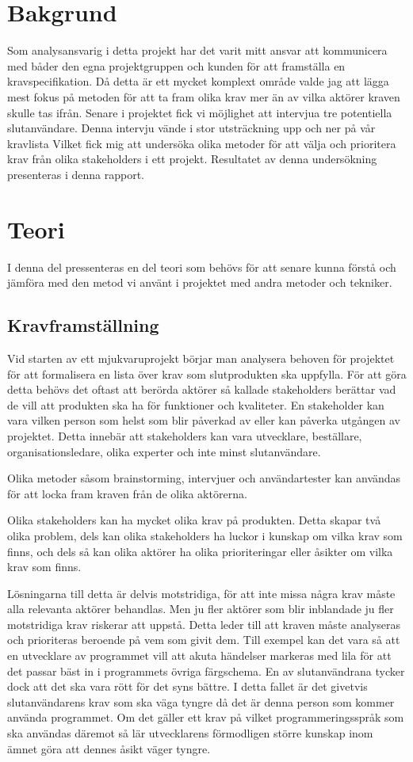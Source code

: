 \section{Bakgrund}
Som analysansvarig i detta projekt har det varit mitt ansvar att kommunicera med båder den egna projektgruppen och kunden för att framställa en kravspecifikation. Då detta är ett mycket komplext område valde jag att lägga mest fokus på metoden för att ta fram olika krav mer än av vilka aktörer kraven skulle tas ifrån. Senare i projektet fick vi möjlighet att intervjua tre potentiella slutanvändare. Denna intervju vände i stor utsträckning upp och ner på vår kravlista Vilket fick mig att undersöka olika metoder för att välja och prioritera krav från olika stakeholders i ett projekt. Resultatet av denna undersökning presenteras i denna rapport.  

\section{Teori}
I denna del pressenteras en del teori som behövs för att senare kunna förstå och jämföra med den metod vi använt i projektet med andra metoder och tekniker.
\subsection{Kravframställning}
Vid starten av ett mjukvaruprojekt börjar man analysera behoven för projektet för att formalisera en lista över krav som slutprodukten ska uppfylla. För att göra detta behövs det oftast att berörda aktörer så kallade stakeholders berättar vad de vill att produkten ska ha för funktioner och kvaliteter. En stakeholder kan vara vilken person som helst som blir påverkad av eller kan påverka utgången av projektet. Detta innebär att stakeholders kan vara  utvecklare, beställare, organisationsledare, olika experter och inte minst slutanvändare. 

Olika metoder såsom brainstorming, intervjuer och användartester kan användas för att locka fram kraven från de olika aktörerna.

Olika stakeholders kan ha mycket olika krav på produkten. Detta skapar två olika problem, dels kan olika stakeholders ha luckor i kunskap om vilka krav som finns, och dels så kan olika aktörer ha olika prioriteringar eller åsikter om vilka krav som finns. 

Lösningarna till detta är delvis motstridiga, för att inte missa några krav måste alla relevanta aktörer behandlas. Men ju fler aktörer som blir inblandade ju fler motstridiga krav riskerar att uppstå. Detta leder till att kraven måste analyseras och prioriteras beroende på vem som givit dem.
Till exempel kan det vara så att en utvecklare av programmet vill att akuta händelser markeras med lila för att det passar bäst in i programmets övriga färgschema. En av slutanvändrana tycker dock att det ska vara rött för det syns bättre. I detta fallet är det givetvis slutanvändarens krav som ska väga tyngre då det är denna person som kommer använda programmet. 
Om det gäller ett krav på vilket programmeringsspråk som ska användas däremot så lär utvecklarens förmodligen större kunskap inom ämnet göra att dennes åsikt väger tyngre.

